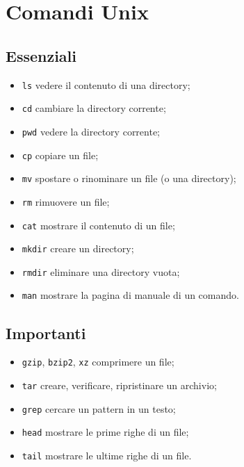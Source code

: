 \newpage
\section{Comandi Unix}
\begin{multicols}{2}
\subsection{Essenziali}
\begin{itemize}
	\item \texttt{ls} vedere il contenuto di una directory;
	\item \texttt{cd} cambiare la directory corrente;
	\item \texttt{pwd} vedere la directory corrente;
	\item \texttt{cp} copiare un file;
	\item \texttt{mv} spostare o rinominare un file (o una directory);
	\item \texttt{rm} rimuovere un file;
	\item \texttt{cat} mostrare il contenuto di un file;
	\item \texttt{mkdir} creare un directory;
	\item \texttt{rmdir} eliminare una directory vuota;
	\item \texttt{man} mostrare la pagina di manuale di un comando.
\end{itemize}

\subsection{Importanti}
\begin{itemize}
	\item \texttt{gzip}, \texttt{bzip2}, \texttt{xz} comprimere un file;
	\item \texttt{tar} creare, verificare, ripristinare un archivio;
	\item \texttt{grep} cercare un pattern in un testo;
	\item \texttt{head} mostrare le prime righe di un file;
	\item \texttt{tail} mostrare le ultime righe di un file.
\end{itemize}


\end{multicols}
